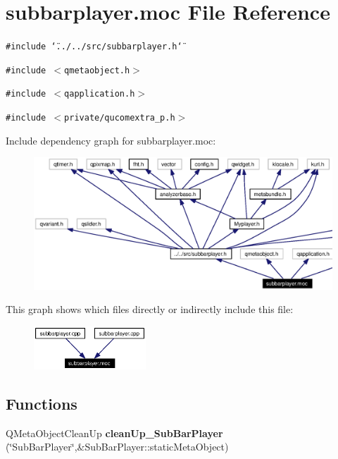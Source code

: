 \section{subbarplayer.moc File Reference}
\label{subbarplayer_8moc}


{\tt \#include \char`\"{}../../src/subbarplayer.h\char`\"{}}\par
{\tt \#include $<$qmetaobject.h$>$}\par
{\tt \#include $<$qapplication.h$>$}\par
{\tt \#include $<$private/qucomextra\_\-p.h$>$}\par


Include dependency graph for subbarplayer.moc:\begin{figure}[H]
\begin{center}
\leavevmode
\includegraphics[width=389pt]{subbarplayer_8moc__incl}
\end{center}
\end{figure}


This graph shows which files directly or indirectly include this file:\begin{figure}[H]
\begin{center}
\leavevmode
\includegraphics[width=119pt]{subbarplayer_8moc__dep__incl}
\end{center}
\end{figure}
\subsection*{Functions}
\begin{CompactItemize}
\item 
QMeta\-Object\-Clean\-Up {\bf clean\-Up\_\-Sub\-Bar\-Player} (\char`\"{}Sub\-Bar\-Player\char`\"{},\&Sub\-Bar\-Player::static\-Meta\-Object)
\end{CompactItemize}



